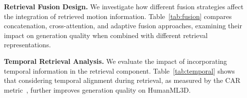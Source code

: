 \documentclass[10pt,journal,compsoc]{IEEEtran}
\begin{document}
\textbf{Retrieval Fusion Design.}
We investigate how different fusion strategies affect the integration of retrieved motion information. Table~\ref{tab:fusion} compares concatenation, cross-attention, and adaptive fusion approaches, examining their impact on generation quality when combined with different retrieval representations.

\begin{table}[t]
    \centering
    \renewcommand{\arraystretch}{1.0}  %
    \caption{Comparison of retrieval fusion design on HumanML3D.}
    \label{tab:fusion}
\end{table}

\textbf{Temporal Retrieval Analysis.}
We evaluate the impact of incorporating temporal information in the retrieval component. Table~\ref{tab:temporal} shows that considering temporal alignment during retrieval, as measured by the CAR metric~\cite{CAR}, further improves generation quality on HumanML3D.
\end{document}
